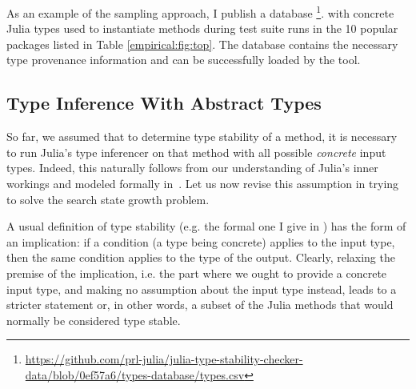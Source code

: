 As an example of the sampling approach, I publish a database
\footnote{%
  \url{https://github.com/prl-julia/julia-type-stability-checker-data/blob/0ef57a6/types-database/types.csv}}.
with concrete Julia types used to instantiate methods during test suite runs in
the 10 popular packages listed in Table \ref{empirical:fig:top}. The database
contains the necessary type provenance information and can be successfully
loaded by the tool.



\subsection{Type Inference With Abstract Types}%
\label{ssec:approx:space:abstract}

So far, we assumed that to determine type stability of a method, it is necessary
to run Julia's type inferencer on that method with all possible \emph{concrete} input
types. Indeed, this naturally follows from our understanding of Julia's inner
workings and modeled formally in~. Let us now revise this
assumption in trying to solve the search state growth problem.

A usual definition of type stability (e.g. the formal one I give in
) has the form of an implication: if a condition (a type
being concrete) applies to the input type, then the same condition applies to
the type of the output. Clearly, relaxing the premise of the implication, i.e.
the part where we ought to provide a concrete input type, and making no
assumption about the input type instead, leads to a stricter statement or, in
other words, a subset of the Julia methods that would normally be considered
type stable.

